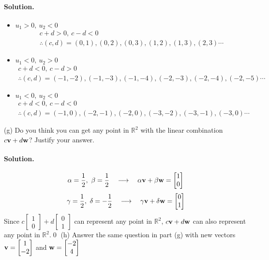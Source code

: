 \paragraph{Solution.}
\begin{itemize}
    \item $u_1 > 0,\ u_2 < 0$
    \begin{gather*}
        c+d > 0,\ c-d < 0\\
        \therefore (c, d) = (0, 1), (0, 2), (0, 3), (1, 2), (1, 3), (2, 3) \cdots
    \end{gather*}
    \item $u_1 < 0,\ u_2 > 0$
    \begin{gather*}
        c+d < 0,\ c-d > 0\\
        \therefore (c, d) = (-1, -2), (-1, -3), (-1, -4), (-2, -3), (-2, -4), (-2, -5) \cdots
    \end{gather*}
    \item $u_1 < 0,\ u_2 < 0$
    \begin{gather*}
        c+d < 0,\ c-d < 0\\
        \therefore (c, d) = (-1, 0), (-2, -1), (-2, 0), (-3, -2), (-3, -1), (-3, 0) \cdots    
    \end{gather*}
\end{itemize}

(g) Do you think you can get any point in $\mathbb{R}^2$ with the linear combination $c\vb{v}+d\vb{w}$? Justify your answer.
\paragraph{Solution.}
$$\alpha = \frac{1}{2},\ \beta = \frac{1}{2}\quad\longrightarrow\quad\alpha\vb{v}+\beta\vb{w} = \begin{bmatrix}
    1\\0
\end{bmatrix}$$
$$\gamma = \frac{1}{2},\ \delta = -\frac{1}{2}\quad\longrightarrow\quad\gamma\vb{v}+\delta\vb{w} = \begin{bmatrix}
    0\\1
\end{bmatrix}$$
Since $c\begin{bmatrix}
    1\\0
\end{bmatrix} + d\begin{bmatrix}
    0\\1
\end{bmatrix}$ can represent any point in $\mathbb{R}^2$, $c\vb{v}+d\vb{w}$ can also represent any point in $\mathbb{R}^2$.\qed
\newpage
(h) Answer the same question in part (g) with new vectors $\vb{v}=\begin{bmatrix}
    1\\-2
\end{bmatrix}$ and $\vb{w}=\begin{bmatrix}
    -2\\4
\end{bmatrix}$
